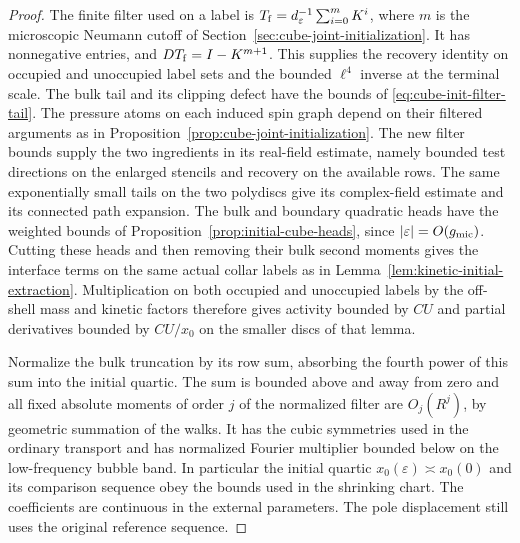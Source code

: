 \documentclass[11pt]{article}
\theoremstyle{definition}
\begin{document}
\begin{proof}
The finite filter used on a label is
\(T_{\rm f}=d_{\varepsilon}^{-1}\sum_{i=0}^{m}K^i\), where \(m\) is the
microscopic Neumann cutoff of Section~\ref{sec:cube-joint-initialization}.
It has nonnegative entries, and \(DT_{\rm f}=I-K^{m+1}\). This supplies the recovery
identity on occupied and unoccupied label sets and the bounded
\(\ell^4\) inverse at the terminal scale. The bulk tail and its
clipping defect have the bounds of
\eqref{eq:cube-init-filter-tail}. The pressure atoms on each
induced spin graph depend on their filtered arguments as in Proposition~\ref{prop:cube-joint-initialization}.
The new filter bounds supply the two ingredients in its
real-field estimate, namely bounded test directions on the
enlarged stencils and recovery on the available rows. The
same exponentially small tails on the two polydiscs give its
complex-field estimate and its connected path expansion.
The bulk and boundary quadratic heads have the weighted
bounds of Proposition~\ref{prop:initial-cube-heads}, since
\(|\varepsilon|=O(g_{\rm mic})\). Cutting these heads and
then removing their bulk second moments gives the interface
terms on the same actual collar labels as in
Lemma~\ref{lem:kinetic-initial-extraction}. Multiplication on
both occupied and unoccupied labels by the off-shell mass and
kinetic factors therefore gives activity bounded by \(CU\)
and partial derivatives bounded by \(CU/x_0\) on the smaller
discs of that lemma.

Normalize the bulk truncation by its row sum, absorbing
the fourth power of this sum into the initial quartic.
The sum is bounded above and away from zero and all fixed
absolute moments of order \(j\) of the normalized filter are
\(O_j(R^j)\), by geometric summation of the walks. It has
the cubic symmetries used in the ordinary transport and
has normalized Fourier multiplier bounded below on the
low-frequency bubble band. In particular the initial quartic
\(x_0(\varepsilon)\asymp x_0(0)\) and its comparison sequence
obey the bounds used in the shrinking chart. The coefficients
are continuous in the external parameters. The pole displacement
still uses the original reference sequence.


\end{proof}
\end{document}

